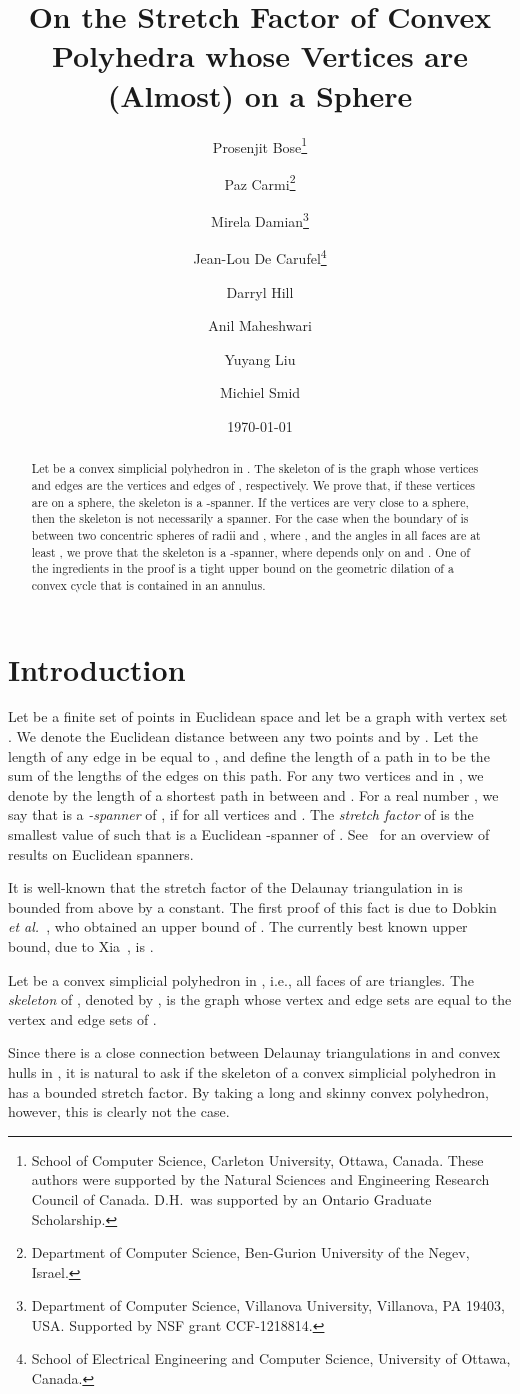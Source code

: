 \documentclass[12pt]{article}
\title{On the Stretch Factor of Convex Polyhedra whose Vertices are 
      (Almost) on a Sphere}
\author{
Prosenjit Bose\thanks{School of Computer Science, Carleton University, 
    Ottawa, Canada. These authors were supported by the 
    Natural Sciences and Engineering Research Council of Canada. 
    D.H.\ was supported by an Ontario Graduate Scholarship.}
\and 
Paz Carmi\thanks{Department of Computer Science, Ben-Gurion University 
   of the Negev, Israel.} 
\and 
Mirela Damian\thanks{Department of Computer Science, Villanova 
   University, Villanova, PA 19403, USA. Supported by NSF grant 
   CCF-1218814.}
\and 
Jean-Lou De Carufel\thanks{School of Electrical Engineering and 
    Computer Science, University of Ottawa, Canada.} 
\and  
Darryl Hill\footnotemark[1] 
\and 
Anil Maheshwari\footnotemark[1] 
\and
Yuyang Liu\footnotemark[1] 
\and 
Michiel Smid\footnotemark[1] 
}
\date{\today}
\begin{document}
 

\maketitle 

\begin{abstract} 
Let  be a convex simplicial polyhedron in . The skeleton of 
 is the graph whose vertices and edges are the vertices and edges 
of , respectively. We prove that, if these vertices are on a 
sphere, the skeleton is a -spanner. If the 
vertices are very close to a sphere, then the skeleton is not 
necessarily a spanner. For the case when the boundary of  is between 
two concentric spheres of radii  and , where , and the 
angles in all faces are at least , we prove that the skeleton 
is a -spanner, where  depends only on  and .  
One of the ingredients in the proof is a tight upper bound on 
the geometric dilation of a convex cycle that is contained in an 
annulus. 
\end{abstract} 


\section{Introduction}
Let  be a finite set of points in Euclidean space and let  be a 
graph with vertex set . We denote the Euclidean distance between any 
two points  and  by . Let the length of any edge  in  
be equal to , and define the length of a path in  to be the sum 
of the lengths of the edges on this path. For any two vertices  and 
 in , we denote by  the length of a shortest path in  
between  and . For a real number , we say that  is a 
\emph{-spanner} of , if  for all vertices  
and . The \emph{stretch factor} of  is the smallest value of  
such that  is a Euclidean -spanner of . See~\cite{ns-gsn-07} 
for an overview of results on Euclidean spanners.

It is well-known that the stretch factor of the Delaunay triangulation
in  is bounded from above by a constant. The first proof of this
fact is due to Dobkin \emph{et al.}~\cite{dfs-dgaag-90}, who obtained
an upper bound of . The currently best
known upper bound, due to Xia~\cite{x-sfdtl-13}, is .

Let  be a convex simplicial polyhedron in , i.e., all faces
of  are triangles. The \emph{skeleton} of , denoted by , 
is the graph whose vertex and edge sets are equal to the vertex and edge 
sets of . 

Since there is a close connection between Delaunay triangulations in 
 and convex hulls in , it is natural to ask if the skeleton 
of a convex simplicial polyhedron in  has a bounded stretch 
factor. By taking a long and skinny convex polyhedron, however, this is 
clearly not the case. 
\end{document}
